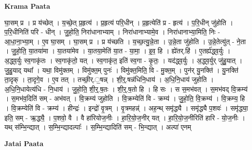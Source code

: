 \documentclass[17pt]{extarticle}
\begin{document}
\textbf{Krama Paata} \newline

घा॒सम् प्र । प्र य॑च्छेत् । य॒च्छे॒त् प्र॒हृत्य॑ । प्र॒हृत्य॑ परि॒धीन् । प्र॒हृत्येति॑ प्र - हृत्य॑ । प॒रि॒धीन् जु॑होति । प॒रि॒धीनिति॑ परि - धीन् । जु॒हो॒ति॒ निरा॑धानाभ्याम् । निरा॑धानाभ्यामे॒व । निरा॑धानाभ्या॒मिति॒ निः - आ॒धा॒ना॒भ्या॒म् । ए॒व घा॒सम् । घा॒सम् प्र । प्र य॑च्छति । य॒च्छ॒त्यु॒न्ने॒ता । उ॒न्ने॒ता जु॑होति । उ॒न्ने॒तेत्यु॑त् - ने॒ता । जु॒हो॒ति॒ या॒तया॑मा । या॒तया॑मेव । या॒तया॒मेति॑ या॒त - या॒मा॒ । इ॒व॒ हि । ह्ये॑तर्.हि॑ । ए॒तर्ह्य॑द्ध्व॒र्युः । अ॒द्ध्व॒र्युः स्व॒गाकृ॑तः । स्व॒गाकृ॑तो॒ यत् । स्व॒गाकृ॑त॒ इति॑ स्व॒गा - कृ॒तः॒ । यद॑द्ध्व॒र्युः । अ॒द्ध्व॒र्युर् जु॑हु॒यात् । जु॒हु॒याद् यथा᳚ । यथा॒ विमु॑क्तम् । विमु॑क्त॒म् पुनः॑ । विमु॑क्त॒मिति॒ वि - मु॒क्त॒म् । पुन॑र् यु॒नक्ति॑ । यु॒नक्ति॑ ता॒दृक् । ता॒दृगे॒व । ए॒व तत् । तच्छी॒र्.॒षन्न् । शी॒र्॒.षन्न॑धिनि॒धाय॑ । अ॒धि॒नि॒धाय॑ जुहोति । अ॒धि॒नि॒धायेत्य॑धि - नि॒धाय॑ । जु॒हो॒ति॒ शी॒र्॒.ष॒तः । शी॒र्॒.ष॒तो हि । हि सः । स स॒मभ॑वत् । स॒मभ॑वद् वि॒क्रम्य॑ । स॒मभ॑व॒दिति॑ सम् - अभ॑वत् । वि॒क्रम्य॑ जुहोति । वि॒क्रम्येति॑ वि - क्रम्य॑ । जु॒हो॒ति॒ वि॒क्रम्य॑ । वि॒क्रम्य॒ हि । वि॒क्रम्येति॑ वि - क्रम्य॑ । हीन्द्रः॑ । इन्द्रो॑ वृ॒त्रम् । वृ॒त्रमहन्न्॑ । अह॒न्थ् समृ॑द्ध्यै । समृ॑द्ध्यै प॒शवः॑ । समृ॑द्ध्या॒ इति॒ सम् - ऋ॒द्ध्यै॒ । प॒शवो॒ वै । वै हा॑रियोज॒नीः । हा॒रि॒यो॒ज॒नीर् यत् । हा॒रि॒यो॒ज॒नीरिति॑ हारि - यो॒ज॒नीः । यथ् स॑म्भि॒न्द्यात् । स॒म्भि॒न्द्यादल्पाः᳚ । स॒म्भि॒न्द्यादिति॑ सम् - भि॒न्द्यात् । अल्पा॑ एनम् \newline

\textbf{Jatai Paata} \newline
\end{document}

